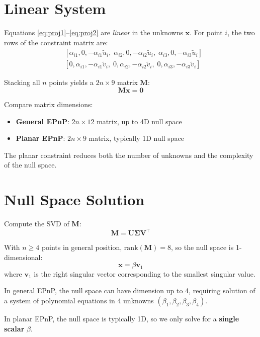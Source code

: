 \documentclass[11pt]{article}
\newcommand{\vect}[1]{\mathbf{#1}}
\newcommand{\mat}[1]{\mathbf{#1}}
\begin{document}
\section{Linear System}

Equations \eqref{eq:proj1}--\eqref{eq:proj2} are \emph{linear} in the unknowns $\vect{x}$. For point $i$, the two rows of the constraint matrix are:
\begin{align*}
&[\alpha_{i1}, 0, -\alpha_{i1}\tilde{u}_i, \; \alpha_{i2}, 0, -\alpha_{i2}\tilde{u}_i, \; \alpha_{i3}, 0, -\alpha_{i3}\tilde{u}_i] \\
&[0, \alpha_{i1}, -\alpha_{i1}\tilde{v}_i, \; 0, \alpha_{i2}, -\alpha_{i2}\tilde{v}_i, \; 0, \alpha_{i3}, -\alpha_{i3}\tilde{v}_i]
\end{align*}

Stacking all $n$ points yields a $2n \times 9$ matrix $\mat{M}$:
\[
\mat{M}\vect{x} = \vect{0}
\]

\begin{planarbox}
Compare matrix dimensions:
\begin{itemize}
    \item \textbf{General EPnP}: $2n \times 12$ matrix, up to 4D null space
    \item \textbf{Planar EPnP}: $2n \times 9$ matrix, typically 1D null space
\end{itemize}
The planar constraint reduces both the number of unknowns and the complexity of the null space.
\end{planarbox}

\section{Null Space Solution}

Compute the SVD of $\mat{M}$:
\[
\mat{M} = \mat{U}\mat{\Sigma}\mat{V}^\top
\]

With $n \geq 4$ points in general position, $\text{rank}(\mat{M}) = 8$, so the null space is 1-dimensional:
\[
\vect{x} = \beta \vect{v}_1
\]
where $\vect{v}_1$ is the right singular vector corresponding to the smallest singular value.

\begin{planarbox}
In general EPnP, the null space can have dimension up to 4, requiring solution of a system of polynomial equations in 4 unknowns $(\beta_1, \beta_2, \beta_3, \beta_4)$.

In planar EPnP, the null space is typically 1D, so we only solve for a \textbf{single scalar} $\beta$.
\end{planarbox}
\end{document}
